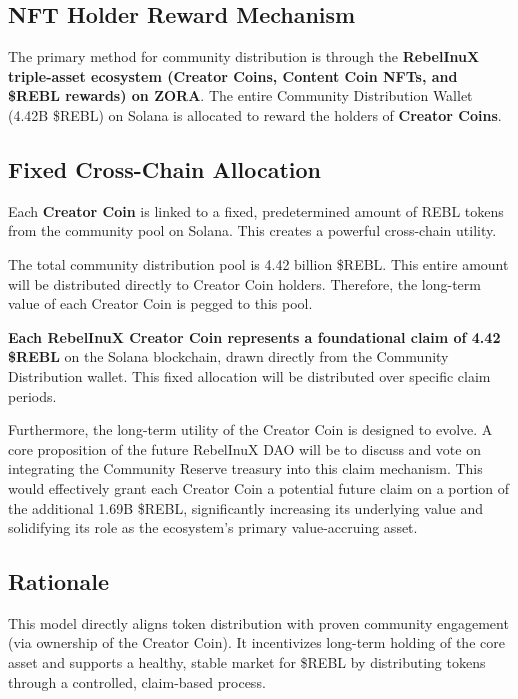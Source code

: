\documentclass{article}
\begin{document}
\begin{tcolorbox}[colback=headerColor!10!white, colframe=headerColor, boxrule=2pt, width=\textwidth, arc=6mm, left=8mm, right=8mm, top=6mm, bottom=6mm]
\subsection[
  \texorpdfstring{\color{primaryColor}NFT Holder Reward Mechanism}{NFT Holder Reward Mechanism}
]{\color{primaryColor}NFT Holder Reward Mechanism}

The primary method for community distribution is through the \textbf{RebelInuX triple-asset ecosystem (Creator Coins, Content Coin NFTs, and \$REBL rewards) on ZORA}. The entire Community Distribution Wallet (4.42B \$REBL) on Solana is allocated to reward the holders of \textbf{Creator Coins}.

\subsection*{\color{primaryColor}Fixed Cross-Chain Allocation}

Each \textbf{Creator Coin} is linked to a fixed, predetermined amount of REBL tokens from the community pool on Solana. This creates a powerful cross-chain utility.

The total community distribution pool is 4.42 billion \$REBL. This entire amount will be distributed directly to Creator Coin holders. Therefore, the long-term value of each Creator Coin is pegged to this pool.

\textbf{Each RebelInuX Creator Coin represents a foundational claim of 4.42 \$REBL} on the Solana blockchain, drawn directly from the Community Distribution wallet. This fixed allocation will be distributed over specific claim periods.

Furthermore, the long-term utility of the Creator Coin is designed to evolve. A core proposition of the future RebelInuX DAO will be to discuss and vote on integrating the Community Reserve treasury into this claim mechanism. This would effectively grant each Creator Coin a potential future claim on a portion of the additional 1.69B \$REBL, significantly increasing its underlying value and solidifying its role as the ecosystem's primary value-accruing asset.


\subsection*{\color{primaryColor}Rationale}

This model directly aligns token distribution with proven community engagement (via ownership of the Creator Coin). It incentivizes long-term holding of the core asset and supports a healthy, stable market for \$REBL by distributing tokens through a controlled, claim-based process.

\end{tcolorbox}
\end{document}
